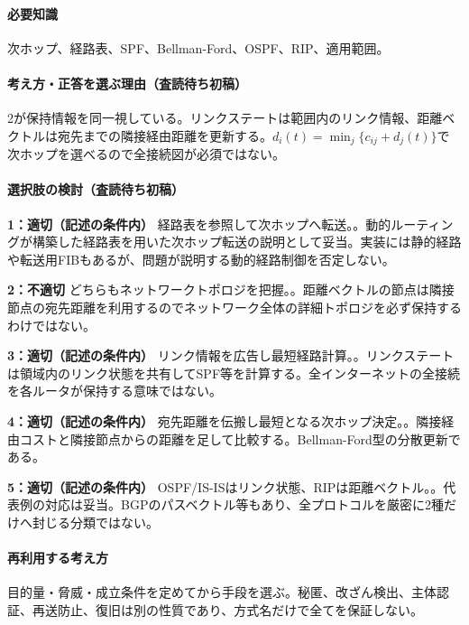 \paragraph{必要知識} 次ホップ、経路表、SPF、Bellman-Ford、OSPF、RIP、適用範囲。

\paragraph{考え方・正答を選ぶ理由（査読待ち初稿）} 2が保持情報を同一視している。リンクステートは範囲内のリンク情報、距離ベクトルは宛先までの隣接経由距離を更新する。\(d_i(t)=\min_j\{c_{ij}+d_j(t)\}\)で次ホップを選べるので全接続図が必須ではない。

\paragraph{選択肢の検討（査読待ち初稿）}\mbox{}\par

\noindent\textbf{1：適切（記述の条件内）} 経路表を参照して次ホップへ転送。。動的ルーティングが構築した経路表を用いた次ホップ転送の説明として妥当。実装には静的経路や転送用FIBもあるが、問題が説明する動的経路制御を否定しない。\par

\noindent\textbf{2：不適切} どちらもネットワークトポロジを把握。。距離ベクトルの節点は隣接節点の宛先距離を利用するのでネットワーク全体の詳細トポロジを必ず保持するわけではない。\par

\noindent\textbf{3：適切（記述の条件内）} リンク情報を広告し最短経路計算。。リンクステートは領域内のリンク状態を共有してSPF等を計算する。全インターネットの全接続を各ルータが保持する意味ではない。\par

\noindent\textbf{4：適切（記述の条件内）} 宛先距離を伝搬し最短となる次ホップ決定。。隣接経由コストと隣接節点からの距離を足して比較する。Bellman-Ford型の分散更新である。\par

\noindent\textbf{5：適切（記述の条件内）} OSPF/IS-ISはリンク状態、RIPは距離ベクトル。。代表例の対応は妥当。BGPのパスベクトル等もあり、全プロトコルを厳密に2種だけへ封じる分類ではない。\par

\paragraph{再利用する考え方} 目的量・脅威・成立条件を定めてから手段を選ぶ。秘匿、改ざん検出、主体認証、再送防止、復旧は別の性質であり、方式名だけで全てを保証しない。

